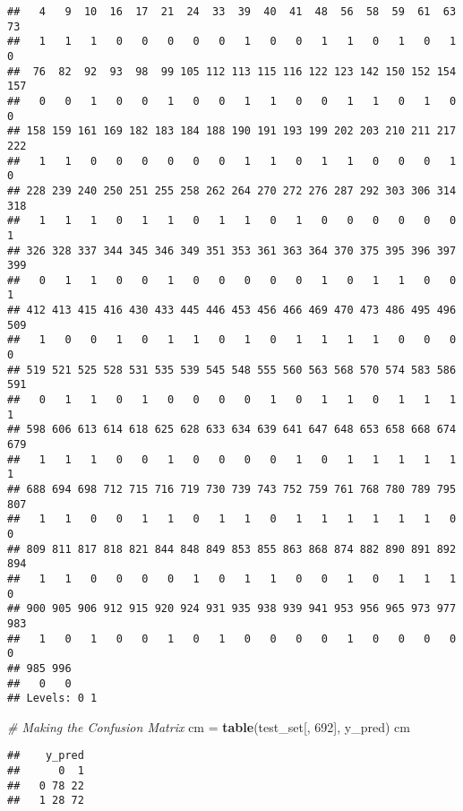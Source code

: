 \documentclass[]{article}
\newenvironment{Shaded}{\begin{snugshade}}{\end{snugshade}}
\newcommand{\CommentTok}[1]{\textcolor[rgb]{0.56,0.35,0.01}{\textit{#1}}}
\newcommand{\DecValTok}[1]{\textcolor[rgb]{0.00,0.00,0.81}{#1}}
\newcommand{\KeywordTok}[1]{\textcolor[rgb]{0.13,0.29,0.53}{\textbf{#1}}}
\newcommand{\NormalTok}[1]{#1}
\newcommand{\StringTok}[1]{\textcolor[rgb]{0.31,0.60,0.02}{#1}}
\begin{document}
\begin{verbatim}
##   4   9  10  16  17  21  24  33  39  40  41  48  56  58  59  61  63  73 
##   1   1   1   0   0   0   0   0   1   0   0   1   1   0   1   0   1   0 
##  76  82  92  93  98  99 105 112 113 115 116 122 123 142 150 152 154 157 
##   0   0   1   0   0   1   0   0   1   1   0   0   1   1   0   1   0   0 
## 158 159 161 169 182 183 184 188 190 191 193 199 202 203 210 211 217 222 
##   1   1   0   0   0   0   0   0   1   1   0   1   1   0   0   0   1   0 
## 228 239 240 250 251 255 258 262 264 270 272 276 287 292 303 306 314 318 
##   1   1   1   0   1   1   0   1   1   0   1   0   0   0   0   0   0   1 
## 326 328 337 344 345 346 349 351 353 361 363 364 370 375 395 396 397 399 
##   0   1   1   0   0   1   0   0   0   0   0   1   0   1   1   0   0   1 
## 412 413 415 416 430 433 445 446 453 456 466 469 470 473 486 495 496 509 
##   1   0   0   1   0   1   1   0   1   0   1   1   1   1   0   0   0   0 
## 519 521 525 528 531 535 539 545 548 555 560 563 568 570 574 583 586 591 
##   0   1   1   0   1   0   0   0   0   1   0   1   1   0   1   1   1   1 
## 598 606 613 614 618 625 628 633 634 639 641 647 648 653 658 668 674 679 
##   1   1   1   0   0   1   0   0   0   0   1   0   1   1   1   1   1   1 
## 688 694 698 712 715 716 719 730 739 743 752 759 761 768 780 789 795 807 
##   1   1   0   0   1   1   0   1   1   0   1   1   1   1   1   1   0   0 
## 809 811 817 818 821 844 848 849 853 855 863 868 874 882 890 891 892 894 
##   1   1   0   0   0   0   1   0   1   1   0   0   1   0   1   1   1   0 
## 900 905 906 912 915 920 924 931 935 938 939 941 953 956 965 973 977 983 
##   1   0   1   0   0   1   0   1   0   0   0   0   1   0   0   0   0   0 
## 985 996 
##   0   0 
## Levels: 0 1
\end{verbatim}

\begin{Shaded}
\begin{Highlighting}[]
\CommentTok{# Making the Confusion Matrix}
\NormalTok{cm =}\StringTok{ }\KeywordTok{table}\NormalTok{(test_set[, }\DecValTok{692}\NormalTok{], y_pred)}
\NormalTok{cm}
\end{Highlighting}
\end{Shaded}

\begin{verbatim}
##    y_pred
##      0  1
##   0 78 22
##   1 28 72
\end{verbatim}
\end{document}
